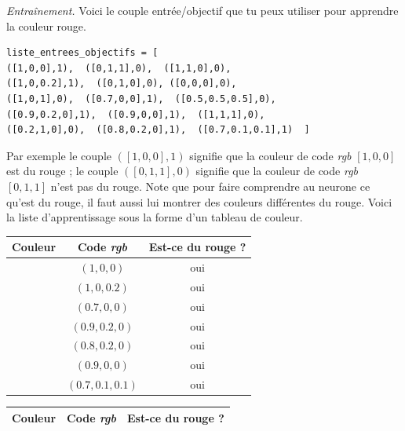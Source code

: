 \documentclass[10pt,class=report,crop=false]{standalone}
\begin{document}
\begin{activite}[Neurone]
\begin{enumerate}
	\emph{Entraînement.}
	Voici le couple entrée/objectif que tu peux utiliser pour apprendre la couleur rouge. 
	
	\begin{center}
	\begin{minipage}{0.8\textwidth}
	\begin{lstlisting}
liste_entrees_objectifs = [ 
([1,0,0],1),  ([0,1,1],0),  ([1,1,0],0),
([1,0,0.2],1),  ([0,1,0],0), ([0,0,0],0),
([1,0,1],0),  ([0.7,0,0],1),  ([0.5,0.5,0.5],0),
([0.9,0.2,0],1),  ([0.9,0,0],1),  ([1,1,1],0),
([0.2,1,0],0),  ([0.8,0.2,0],1),  ([0.7,0.1,0.1],1)  ]
	\end{lstlisting}
	\end{minipage}
	\end{center}
Par exemple le couple $([1,0,0],1)$ signifie que la couleur
de code \emph{rgb} $[1,0,0]$ est du rouge ; le couple $([0,1,1],0)$ signifie que la couleur
de code \emph{rgb} $[0,1,1]$ n'est pas du rouge.
Note que pour faire comprendre au neurone ce qu'est du rouge, il faut aussi lui montrer des couleurs différentes du rouge. Voici la liste d'apprentissage sous la forme d'un tableau de couleur.


\begin{center}
	\begin{tabular}{|c|c|c|}
		\hline
		Couleur &  Code \emph{rgb}  & Est-ce du rouge ? \\ \hline\hline
		
		\cellcolor{red1}  & $(1,0,0)$ & oui \\ \hline
        \cellcolor{red2}  & $(1,0,0.2)$ & oui \\ \hline
		\cellcolor{red3}  & $(0.7,0,0)$ & oui \\ \hline
		\cellcolor{red4}  & $(0.9,0.2,0)$ & oui \\ \hline  
		\cellcolor{red5}  & $(0.8,0.2,0)$ & oui \\ \hline
		\cellcolor{red6}  & $(0.9,0,0)$ & oui \\ \hline
		\cellcolor{red7}  & $(0.7,0.1,0.1)$ & oui \\ \hline		         
	\end{tabular}\qquad 
	\begin{tabular}{|c|c|c|}
	\hline
	Couleur &  Code \emph{rgb}  & Est-ce du rouge ? \\ \hline\hline
	

\end{tabular}
\end{center}
\end{enumerate}
\end{activite}
\end{document}

